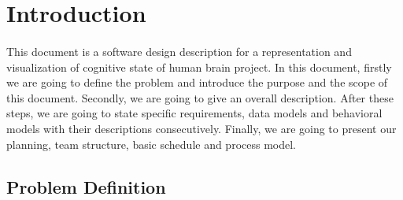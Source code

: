 \documentclass[paper=a4, fontsize=12pt]{scrartcl}	%
\numberwithin{equation}{section}		%
\numberwithin{figure}{section}			%
\numberwithin{table}{section}				%
\newcommand{\skipsubsection}[0]{\vspace{1cm}}
\begin{document}
	
	\section{Introduction}
    \paragraph{}
    \normalsize
    This document is a software design description for a representation and visualization of cognitive state of human brain project. In this document, firstly we are going to define the problem and introduce the purpose and the scope of this document. Secondly, we are going to give an overall description. After these steps, we are going to  state specific requirements, data models and behavioral models with their descriptions consecutively. 
Finally, we are going to present our planning, team structure, basic schedule and process model.\\

	\skipsubsection
 
	\subsection{Problem Definition}
\end{document}
